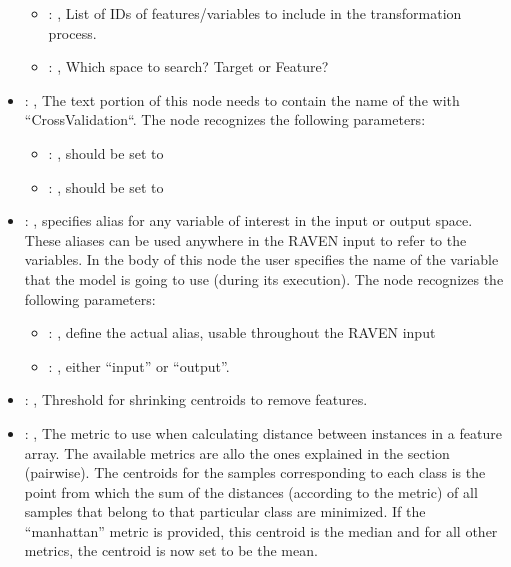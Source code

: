 \begin{itemize}
\begin{itemize}
        \item {}: , 
          List of IDs of features/variables to include in the transformation process.

        \item {}: , 
          Which space to search? Target or Feature?
      \end{itemize}

    \item {}: , 
      The text portion of this node needs to contain the name of the  with
               ``CrossValidation``.
      The  node recognizes the following parameters:
        \begin{itemize}
          \item {}: , 
            should be set to 
          \item {}: , 
            should be set to 
      \end{itemize}

    \item {}: , 
      specifies alias for         any variable of interest in the input or output space. These
      aliases can be used anywhere in the RAVEN input to         refer to the variables. In the body
      of this node the user specifies the name of the variable that the model is going to use
      (during its execution).
      The  node recognizes the following parameters:
        \begin{itemize}
          \item {}: , 
            define the actual alias, usable throughout the RAVEN input
          \item {}: , 
            either ``input'' or ``output''.
      \end{itemize}

    \item {}: , 
      Threshold for shrinking centroids to remove features.

    \item {}: , 
      The metric to use when calculating distance between instances in a feature array.
      The available metrics are allo the ones explained in the  section (pairwise).
      The centroids for the samples corresponding to each class is the point from which the sum of
      the distances (according to the metric) of all samples that belong to that particular class
      are                                                  minimized. If the ``manhattan'' metric is
      provided, this centroid is the median and for all other metrics,
      the centroid is now set to be the mean.
  \end{itemize}


